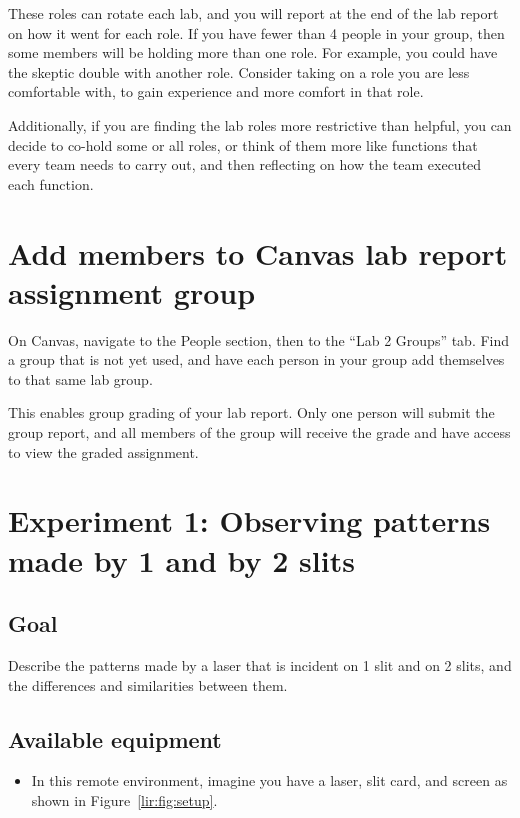 These roles can rotate each lab, and you will report at the end of the lab report on how it went for each role. If you have fewer than 4 people in your group, then some members will be holding more than one role. For example, you could have the skeptic double with another role. Consider taking on a role you are less comfortable with, to gain experience and more comfort in that role.

Additionally, if you are finding the lab roles more restrictive than helpful, you can decide to co-hold some or all roles, or think of them more like functions that every team needs to carry out, and then reflecting on how the team executed each function.

\section{Add members to Canvas lab report assignment group}

\begin{steps}
	\item On Canvas, navigate to the People section, then to the ``Lab 2 Groups'' tab. Find a group that is not yet used, and have each person in your group add themselves to that same lab group.
\end{steps}

This enables group grading of your lab report. Only one person will submit the group report, and all members of the group will receive the grade and have access to view the graded assignment.

\section{Experiment 1: Observing patterns made by 1 and by 2 slits}\label{li:sec:exp1}

\subsection{Goal}

Describe the patterns made by a laser that is incident on 1 slit and on 2 slits, and the differences and similarities between them.

\subsection{Available equipment}

\begin{itemize}
	\item In this remote environment, imagine you have a laser, slit card, and screen as shown in Figure\ \ref{lir:fig:setup}.
\end{itemize}

